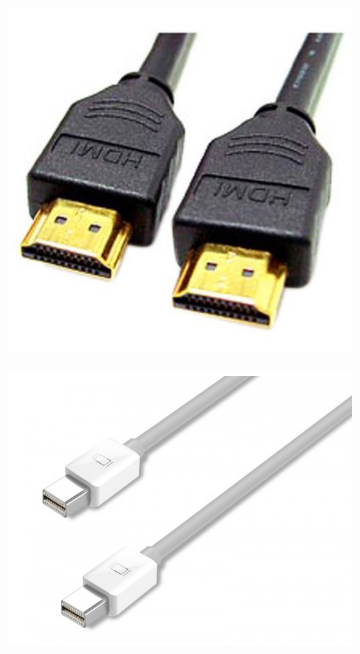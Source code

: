 \documentclass{scrartcl}
\begin{document}
\begin{figure}[h]
    \centering
    \begin{subfigure}[t]{0.25\textwidth}
        \centering
        \includegraphics[width=\textwidth]{img/hdmi}
        \label{subfig:hdmi}
    \end{subfigure}%
    \hfill 
    \begin{subfigure}[t]{0.25\textwidth}
        \centering
        \includegraphics[width=\textwidth]{img/minidisplay}

\end{subfigure}
\end{figure}
\end{document}
